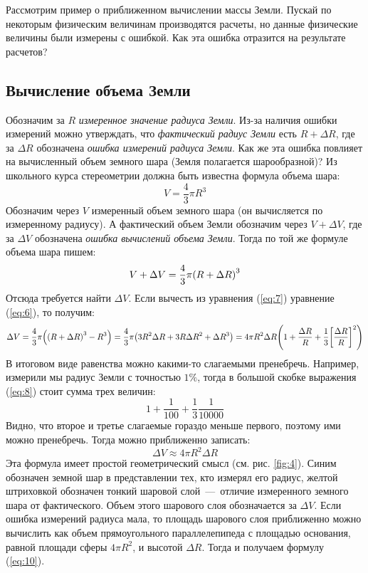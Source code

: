 \documentclass[a4paper,9pt,russian]{article}
\begin{document}
\par
Рассмотрим пример о приближенном вычислении массы Земли. Пускай по некоторым физическим величинам производятся расчеты, но данные физические величины были измерены с ошибкой. Как эта ошибка отразится на результате расчетов?

\subsection{Вычисление объема Земли}
Обозначим за $R$ \emph{измеренное значение радиуса Земли}. Из\--за наличия ошибки измерений можно утверждать, что \emph{фактический радиус Земли} есть $R+\Delta R$, где за $\Delta R$ обозначена \emph{ошибка измерений радиуса Земли}. Как же эта ошибка повлияет на вычисленный объем земного шара (Земля полагается шарообразной)? Из школьного курса стереометрии должна быть известна формула объема шара:
\begin{equation}\label{eq:6}
 V = \dfrac43 \pi R^3
\end{equation}
Обозначим через $V$ измеренный объем земного шара (он вычисляется по измеренному радиусу). А фактический объем Земли обозначим через $V + \Delta V$, где  за $\Delta V$ обозначена \emph{ошибка вычислений объема Земли}. Тогда по той же формуле объема шара пишем:
\begin{equation}\label{eq:7}
 V + \Delta V = \dfrac43 \pi \qty(R + \Delta R)^3
\end{equation}
Отсюда требуется найти $\Delta V$. Если вычесть из уравнения (\ref{eq:7}) уравнение (\ref{eq:6}), то получим:
\begin{equation}\label{eq:8}
 \Delta V = \dfrac43 \pi \qty(\qty(R + \Delta R)^3 - R^3)=\dfrac43 \pi \qty(3R^2\Delta R + 3R \Delta R^2 + \Delta R^3) = 4 \pi R^2\Delta R \qty( 1 + \dfrac{\Delta R}{R} +\dfrac{1}{3} \qty[\dfrac{\Delta  R}{R}]^2 )
\end{equation}
В итоговом виде равенства можно какими-то слагаемыми пренебречь. Например, измерили мы радиус Земли с точностью $1\%$, тогда в большой скобке выражения (\ref{eq:8}) стоит сумма трех величин:
\begin{equation}
 1 + \dfrac{1}{100} + \dfrac{1}{3}\dfrac{1}{10000}
\end{equation}
Видно, что второе и третье слагаемые гораздо меньше первого, поэтому ими можно пренебречь. Тогда можно приближенно записать:
\begin{equation}\label{eq:10}
 \Delta V \approx 4 \pi R^2\Delta R
\end{equation}
Эта формула имеет простой геометрический смысл (см. рис. \ref{fig:4}). Синим обозначен земной шар в представлении тех, кто измерял его радиус, желтой штриховкой обозначен тонкий шаровой слой~\----~отличие измеренного земного шара от фактического. Объем этого шарового слоя обозначается за $\Delta V$. Если ошибка измерений радиуса мала, то площадь шарового слоя приближенно можно вычислить как объем прямоугольного параллелепипеда с площадью основания, равной площади сферы $4 \pi R^2$, и высотой $\Delta R$. Тогда и получаем формулу (\ref{eq:10}).
\end{document}
